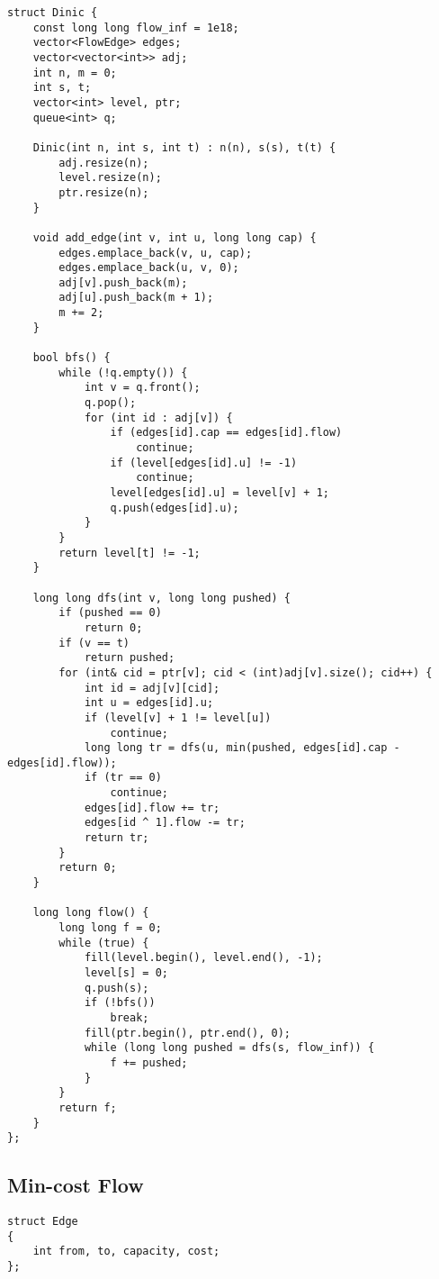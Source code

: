 \documentclass[10pt]{article}
\begin{document}
\begin{multicols*}{2}
\begin{lstlisting}[style=compactcpp]
struct Dinic {
    const long long flow_inf = 1e18;
    vector<FlowEdge> edges;
    vector<vector<int>> adj;
    int n, m = 0;
    int s, t;
    vector<int> level, ptr;
    queue<int> q;

    Dinic(int n, int s, int t) : n(n), s(s), t(t) {
        adj.resize(n);
        level.resize(n);
        ptr.resize(n);
    }

    void add_edge(int v, int u, long long cap) {
        edges.emplace_back(v, u, cap);
        edges.emplace_back(u, v, 0);
        adj[v].push_back(m);
        adj[u].push_back(m + 1);
        m += 2;
    }

    bool bfs() {
        while (!q.empty()) {
            int v = q.front();
            q.pop();
            for (int id : adj[v]) {
                if (edges[id].cap == edges[id].flow)
                    continue;
                if (level[edges[id].u] != -1)
                    continue;
                level[edges[id].u] = level[v] + 1;
                q.push(edges[id].u);
            }
        }
        return level[t] != -1;
    }

    long long dfs(int v, long long pushed) {
        if (pushed == 0)
            return 0;
        if (v == t)
            return pushed;
        for (int& cid = ptr[v]; cid < (int)adj[v].size(); cid++) {
            int id = adj[v][cid];
            int u = edges[id].u;
            if (level[v] + 1 != level[u])
                continue;
            long long tr = dfs(u, min(pushed, edges[id].cap - edges[id].flow));
            if (tr == 0)
                continue;
            edges[id].flow += tr;
            edges[id ^ 1].flow -= tr;
            return tr;
        }
        return 0;
    }

    long long flow() {
        long long f = 0;
        while (true) {
            fill(level.begin(), level.end(), -1);
            level[s] = 0;
            q.push(s);
            if (!bfs())
                break;
            fill(ptr.begin(), ptr.end(), 0);
            while (long long pushed = dfs(s, flow_inf)) {
                f += pushed;
            }
        }
        return f;
    }
};
\end{lstlisting}

\subsection{Min-cost Flow}

\begin{lstlisting}[style=compactcpp]
struct Edge
{
    int from, to, capacity, cost;
};


\end{lstlisting}
\end{multicols*}
\end{document}
